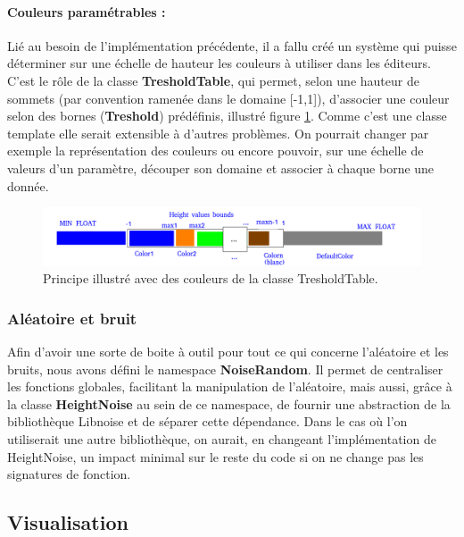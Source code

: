 \documentclass[a4paper]{article}
\begin{document}
\paragraph{Couleurs paramétrables :}

Lié au besoin de l'implémentation précédente, il a fallu créé un système qui puisse déterminer sur une échelle de hauteur les couleurs à utiliser dans les éditeurs. C'est le rôle de la classe \textbf{TresholdTable}, qui permet, selon une hauteur de sommets (par convention ramenée dans le domaine [-1,1]), d'associer une couleur selon des bornes (\textbf{Treshold}) prédéfinis, illustré figure \ref{archi_treshold}. Comme c'est une classe template elle serait extensible à d'autres problèmes. On pourrait changer par exemple la représentation des couleurs ou encore pouvoir, sur une échelle de valeurs d'un paramètre, découper son domaine et associer à chaque borne une donnée.

\begin{figure}[!ht]
        \begin{center} \includegraphics[width=\linewidth]{img/archi/example_treshold.png}\end{center}
        \caption{\label{archi_treshold}Principe illustré avec des couleurs de la classe TresholdTable.}
\end{figure}

\newpage
\subsubsection{Aléatoire et bruit}

Afin d'avoir une sorte de boite à outil pour tout ce qui concerne l'aléatoire et les bruits, nous avons défini le namespace \textbf{NoiseRandom}. Il permet de centraliser les fonctions globales, facilitant la manipulation de l'aléatoire, mais aussi, grâce à la classe \textbf{HeightNoise} au sein de ce namespace, de fournir une abstraction de la bibliothèque Libnoise et de séparer cette dépendance. Dans le cas où l'on utiliserait une autre bibliothèque, on aurait, en changeant l'implémentation de HeightNoise, un impact minimal sur le reste du code si on ne change pas les signatures de fonction.

\subsection{Visualisation}
\end{document}
